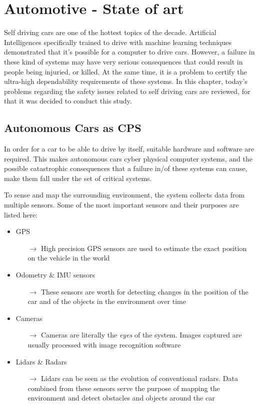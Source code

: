 \chapter{Automotive - State of art}

Self driving cars are one of the hottest topics of the decade. Artificial Intelligences specifically trained to drive with machine learning techniques demonstrated that it's possible for a computer to drive cars. However, a failure in these kind of systems may have very serious consequences that could result in people being injuried, or killed. At the same time, it is a problem to certify the ultra-high dependability requirements of these systems. In this chapter, today's problems regarding the safety issues related to self driving cars are reviewed, for that it was decided to conduct this study.

\section{Autonomous Cars as CPS}

In order for a car to be able to drive by itself, suitable hardware and software are required. This makes autonomous cars cyber physical computer systems, and the possible catastrophic consequences that a failure in/of these systems can cause, make them fall under the set of critical systems.

To sense and map the surrounding environment, the system collects data from multiple sensors. Some of the most important sensors and their purposes are listed here:

\begin{itemize}
	\item GPS
	\begin{itemize}
		\item[$\rightarrow$] High precision GPS sensors are used to estimate the exact position on the vehicle in the world
	\end{itemize}
	\item Odometry \& IMU sensors
	\begin{itemize}
		\item[$\rightarrow$] These sensors are worth for detecting changes in the position of the car and of the objects in the environment over time
	\end{itemize}
	\item Cameras
	\begin{itemize}
		\item[$\rightarrow$] Cameras are literally the \textsl{eyes} of the system. Images captured are usually processed with image recognition software
	\end{itemize}
	\item Lidars \& Radars
	\begin{itemize}
		\item[$\rightarrow$] Lidars can be seen as the evolution of conventional radars. Data combined from these sensors serve the purpose of mapping the environment and detect obstacles and objects around the car
	\end{itemize}
\end{itemize}

